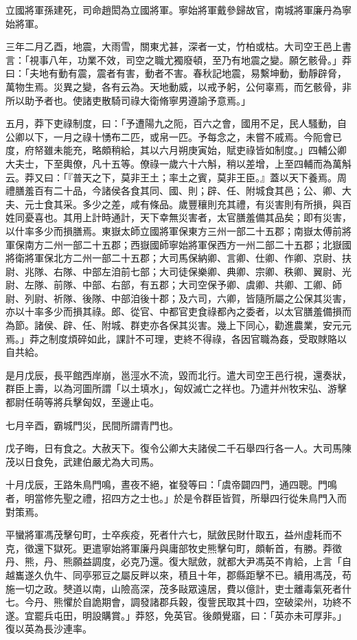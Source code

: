 \begin{pinyinscope}
立國將軍孫建死，司命趙閎為立國將軍。寧始將軍戴參歸故官，南城將軍廉丹為寧始將軍。

三年二月乙酉，地震，大雨雪，關東尤甚，深者一丈，竹柏或枯。大司空王邑上書言：「視事八年，功業不效，司空之職尤獨廢頓，至乃有地震之變。願乞骸骨。」莽曰：「夫地有動有震，震者有害，動者不害。春秋記地震，易繫坤動，動靜辟脅，萬物生焉。災異之變，各有云為。天地動威，以戒予躬，公何辜焉，而乞骸骨，非所以助予者也。使諸吏散騎司祿大衛脩寧男遵諭予意焉。」

五月，莽下吏祿制度，曰：「予遭陽九之阨，百六之會，國用不足，民人騷動，自公卿以下，一月之祿十愑布二匹，或帛一匹。予每念之，未嘗不戚焉。今阨會已度，府帑雖未能充，略頗稍給，其以六月朔庚寅始，賦吏祿皆如制度。」四輔公卿大夫士，下至輿僚，凡十五等。僚祿一歲六十六斛，稍以差增，上至四輔而為萬斛云。莽又曰：「『普天之下，莫非王土；率土之賓，莫非王臣。』蓋以天下養焉。周禮膳羞百有二十品，今諸侯各食其同、國、則；辟、任、附城食其邑；公、卿、大夫、元士食其采。多少之差，咸有條品。歲豐穰則充其禮，有災害則有所損，與百姓同憂喜也。其用上計時通計，天下幸無災害者，太官膳羞備其品矣；即有災害，以什率多少而損膳焉。東嶽太師立國將軍保東方三州一部二十五郡；南嶽太傅前將軍保南方二州一部二十五郡；西嶽國師寧始將軍保西方一州二部二十五郡；北嶽國將衛將軍保北方二州一部二十五郡；大司馬保納卿、言卿、仕卿、作卿、京尉、扶尉、兆隊、右隊、中部左洎前七部；大司徒保樂卿、典卿、宗卿、秩卿、翼尉、光尉、左隊、前隊、中部、右部，有五郡；大司空保予卿、虞卿、共卿、工卿、師尉、列尉、祈隊、後隊、中部洎後十郡；及六司，六卿，皆隨所屬之公保其災害，亦以十率多少而損其祿。郎、從官、中都官吏食祿都內之委者，以太官膳羞備損而為節。諸侯、辟、任、附城、群吏亦各保其災害。幾上下同心，勸進農業，安元元焉。」莽之制度煩碎如此，課計不可理，吏終不得祿，各因官職為姦，受取賕賂以自共給。

是月戊辰，長平館西岸崩，邕涇水不流，毀而北行。遣大司空王邑行視，還奏狀，群臣上壽，以為河圖所謂「以土填水」，匈奴滅亡之祥也。乃遣并州牧宋弘、游擊都尉任萌等將兵擊匈奴，至邊止屯。

七月辛酉，霸城門災，民間所謂青門也。

戊子晦，日有食之。大赦天下。復令公卿大夫諸侯二千石舉四行各一人。大司馬陳茂以日食免，武建伯嚴尤為大司馬。

十月戊辰，王路朱鳥門鳴，晝夜不絕，崔發等曰：「虞帝闢四門，通四聰。門鳴者，明當修先聖之禮，招四方之士也。」於是令群臣皆賀，所舉四行從朱鳥門入而對策焉。

平蠻將軍馮茂擊句町，士卒疾疫，死者什六七，賦斂民財什取五，益州虛耗而不克，徵還下獄死。更遣寧始將軍廉丹與庸部牧史熊擊句町，頗斬首，有勝。莽徵丹、熊，丹、熊願益調度，必克乃還。復大賦斂，就都大尹馮英不肯給，上言「自越巂遂久仇牛、同亭邪豆之屬反畔以來，積且十年，郡縣距擊不已。續用馮茂，苟施一切之政。僰道以南，山險高深，茂多敺眾遠居，費以億計，吏士離毒氣死者什七。今丹、熊懼於自詭期會，調發諸郡兵穀，復訾民取其十四，空破梁州，功終不遂。宜罷兵屯田，明設購賞。」莽怒，免英官。後頗覺寤，曰：「英亦未可厚非。」復以英為長沙連率。


\end{pinyinscope}

